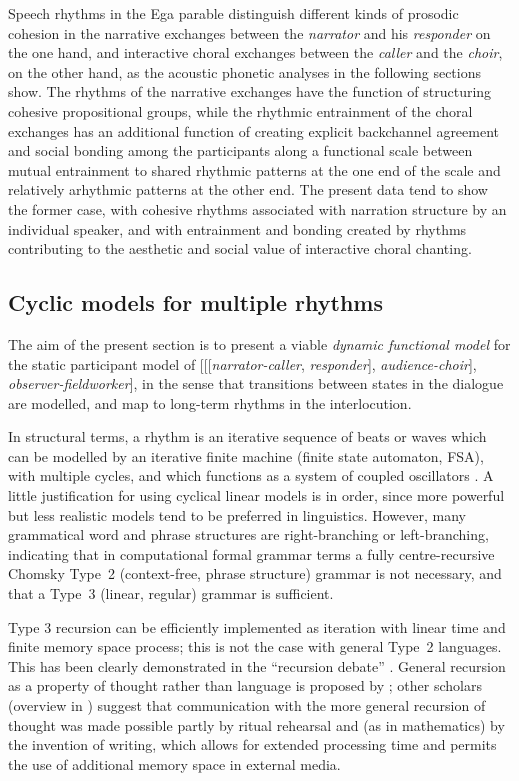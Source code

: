 \documentclass[output=paper,colorlinks,citecolor=brown]{langscibook}
\begin{document}
Speech rhythms in the Ega parable distinguish different kinds of prosodic cohesion in the narrative exchanges between the \textit{narrator} and his \textit{responder} on the one hand, and interactive choral exchanges between the \textit{caller} and the \textit{choir}, on the other hand, as the acoustic phonetic analyses in the following sections show. The rhythms of the narrative exchanges have the function of structuring cohesive propositional groups, while the rhythmic entrainment of the choral exchanges has an additional function of creating explicit backchannel agreement and social bonding among the participants along a functional scale between mutual entrainment to shared rhythmic patterns at the one end of the scale and relatively arhythmic patterns at the other end. The present data tend to show the former case, with cohesive rhythms associated with narration structure by an individual speaker, and with entrainment and bonding created by rhythms contributing to the aesthetic and social value of interactive choral chanting.

\subsection{Cyclic models for multiple rhythms}

The aim of the present section is to present a viable \textit{dynamic functional model} for the static participant model of [[[\textit{narrator-caller}, \textit{responder}], \textit{audience-choir}], \textit{observer-fieldworker}], in the sense that transitions between states in the dialogue are modelled, and map to long-term rhythms in the interlocution.

In structural terms, a rhythm is an iterative sequence of beats or waves which can be modelled by an iterative finite machine (finite state automaton, FSA), with multiple cycles, and which functions as a system of coupled oscillators \citep{cumminsport1998, odellnieminen1999, barbosa2002}. A little justification for using cyclical linear models is in order, since more powerful but less realistic models tend to be preferred in linguistics. However, many grammatical word and phrase structures are right-branching or left-branching, indicating that in computational formal grammar terms a fully centre-recursive Chomsky Type~2 (context-free, phrase structure) grammar is not necessary, and that a Type~3 (linear, regular) grammar is sufficient.

Type 3 recursion can be efficiently implemented as iteration with linear time and finite memory space process; this is not the case with general Type~2 languages. This has been clearly demonstrated in the “recursion debate” \citep{karlsson2010}. General recursion as a property of thought rather than language is proposed by \citet{everett2016}; other scholars (overview in \citealt{gibbongriffiths2017}) suggest that communication with the more general recursion of thought was made possible partly by ritual rehearsal and (as in mathematics) by the invention of writing, which allows for extended processing time and permits the use of additional memory space in external media.
\end{document}
